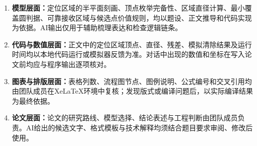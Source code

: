 \documentclass[12pt,a4paper]{article}
\begin{document}
\begin{enumerate}[label=\arabic*.]
    \item \textbf{模型层面：}定位区域的半平面刻画、顶点枚举完备性、区域直径计算、最小覆盖圆判据、可靠接收区域与候选点价值规则，均以题设、正文推导和代码实现为依据。AI输出仅用于辅助梳理表达和检查逻辑链条。

    \item \textbf{代码与数值层面：}正文中的定位区域顶点、直径、残差、模拟清除结果及运行时间均以本地代码运行或模拟器反馈为准。对话中出现的数值和坐标在写入论文前均应与程序输出逐项核对。

    \item \textbf{图表与排版层面：}表格列数、流程图节点、图例说明、公式编号和交叉引用均由团队成员在XeLaTeX环境中复核；发现版式或编译问题后，以实际编译结果为最终依据。

    \item \textbf{论文层面：}论文的研究路线、模型选择、结论表述与工程判断由团队成员负责。AI给出的候选文字、格式模板与技术解释均须结合题目要求审阅、修改后使用。
\end{enumerate}
\end{document}
